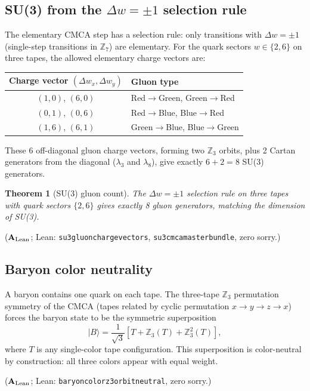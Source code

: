 \documentclass[11pt]{article}
\newtheorem{theorem}{Theorem}[section]
\theoremstyle{remark}
\newcommand{\ZS}{\mathbb{Z}_7}
\newcommand{\ZZ}{\mathbb{Z}}
\newcommand{\lean}[1]{%
  \penalty-100
  \begingroup\def\_{\textunderscore\allowbreak}\texttt{#1}\endgroup}
\newcommand{\CatAL}{\ensuremath{\textbf{A}_{\rm Lean}}}
\begin{document}
\subsection{SU(3) from the $\Delta w = \pm 1$ selection rule}
\label{ssec:su3}

The elementary CMCA step has a selection rule: only transitions with
$\Delta w = \pm 1$ (single-step transitions in $\ZS$) are elementary.
For the quark sectors $w\in\{2,6\}$ on three tapes, the allowed elementary
charge vectors are:
\begin{center}
\begin{tabular}{cl}
\toprule
Charge vector $(\Delta w_x, \Delta w_y)$ & Gluon type\\
\midrule
$(1,0)$, $(6,0)$ & Red$\to$Green, Green$\to$Red\\
$(0,1)$, $(0,6)$ & Red$\to$Blue, Blue$\to$Red\\
$(1,6)$, $(6,1)$ & Green$\to$Blue, Blue$\to$Green\\
\bottomrule
\end{tabular}
\end{center}
These 6 off-diagonal gluon charge vectors, forming two $\ZZ_3$ orbits, plus 2
Cartan generators from the diagonal ($\lambda_3$ and $\lambda_8$), give exactly
$6 + 2 = 8$ SU(3) generators.

\begin{theorem}[SU(3) gluon count]
The $\Delta w = \pm 1$ selection rule on three tapes with quark sectors
$\{2,6\}$ gives exactly 8 gluon generators, matching the dimension of SU(3).
\end{theorem}

($\CatAL$; Lean: \lean{su3\_gluon\_charge\_vectors}, \lean{su3\_cmca\_master\_bundle},
zero sorry.)

\subsection{Baryon color neutrality}
\label{ssec:color_neutral}

A baryon contains one quark on each tape. The three-tape $\ZZ_3$ permutation
symmetry of the CMCA (tapes related by cyclic permutation $x\to y\to z\to x$)
forces the baryon state to be the symmetric superposition
\[
  |B\rangle = \frac{1}{\sqrt{3}}\left[T + \ZZ_3(T) + \ZZ_3^2(T)\right],
\]
where $T$ is any single-color tape configuration. This superposition is
color-neutral by construction: all three colors appear with equal weight.

($\CatAL$; Lean: \lean{baryon\_color\_z3\allowbreak\_orbit\_neutral}, zero sorry.)
\end{document}
